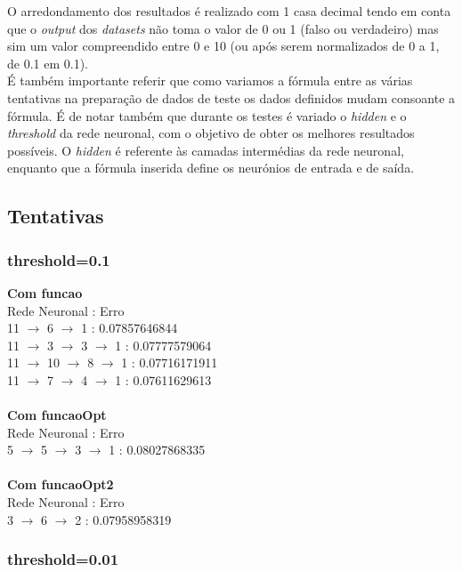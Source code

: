 \documentclass{article}
\begin{document}
O arredondamento dos resultados é realizado com 1 casa decimal tendo em conta que o \textit{output} dos \textit{datasets} não toma o valor de 0 ou 1 (falso ou verdadeiro) mas sim um valor compreendido entre 0 e 10 (ou após serem normalizados de 0 a 1, de 0.1 em 0.1).\\
É também importante referir que como variamos a fórmula entre as várias tentativas na preparação de dados de teste os dados definidos mudam consoante a fórmula. É de notar também que durante os testes é variado o \textit{hidden} e o \textit{threshold} da rede neuronal, com o objetivo de obter os melhores resultados possíveis.
O \textit{hidden} é referente às camadas intermédias da rede neuronal, enquanto que a fórmula inserida define os neurónios de entrada e de saída.

\subsection{Tentativas}

\subsubsection{threshold=0.1}

\textbf{Com funcao}\\
Rede Neuronal : Erro\\
11 $\to$ 6 $\to$ 1 : 0.07857646844\\
11 $\to$ 3 $\to$ 3 $\to$ 1 : 0.07777579064\\
11 $\to$ 10 $\to$ 8 $\to$ 1 : 0.07716171911\\
11 $\to$ 7 $\to$ 4 $\to$ 1 : 0.07611629613\\
\\
\textbf{Com funcaoOpt}\\
Rede Neuronal : Erro\\
5 $\to$ 5 $\to$ 3 $\to$ 1 : 0.08027868335\\
\\
\textbf{Com funcaoOpt2}\\
Rede Neuronal : Erro\\
3 $\to$ 6 $\to$ 2 : 0.07958958319\\

\subsubsection{threshold=0.01}
\end{document}
